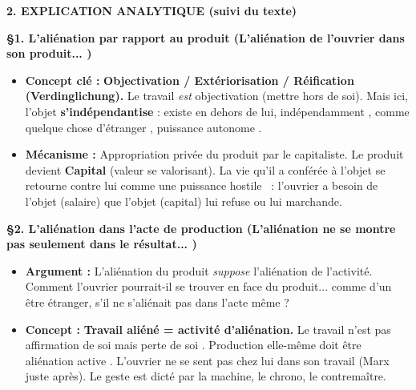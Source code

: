 \documentclass[11pt]{article}
\begin{document}
\begin{corrige}
\textbf{2. EXPLICATION ANALYTIQUE (suivi du texte)}

\textbf{§1. L'aliénation par rapport au produit (\guillemotleft L'aliénation de l'ouvrier dans son produit... \guillemotright)}
\begin{itemize}
\item \textbf{Concept clé :} \textbf{Objectivation / Extériorisation / Réification (Verdinglichung).} Le travail \emph{est} objectivation (mettre hors de soi). Mais ici, l'objet \textbf{s'indépendantise} : \guillemotleft existe en dehors de lui, indépendamment \guillemotright, \guillemotleft comme quelque chose d'étranger \guillemotright, \guillemotleft puissance autonome \guillemotright.
\item \textbf{Mécanisme :} Appropriation privée du produit par le capitaliste. Le produit devient \textbf{Capital} (valeur se valorisant). \guillemotleft La vie qu'il a conférée à l'objet se retourne contre lui comme une puissance hostile \guillemotright\ : l'ouvrier a besoin de l'objet (salaire) que l'objet (capital) lui refuse ou lui marchande.
\end{itemize}

\textbf{§2. L'aliénation dans l'acte de production (\guillemotleft L'aliénation ne se montre pas seulement dans le résultat... \guillemotright)}
\begin{itemize}
\item \textbf{Argument :} L'aliénation du produit \emph{suppose} l'aliénation de l'activité. \guillemotleft Comment l'ouvrier pourrait-il se trouver en face du produit... comme d'un être étranger, s'il ne s'aliénait pas dans l'acte même ? \guillemotright
\item \textbf{Concept :} \textbf{Travail aliéné = activité d'aliénation.} Le travail n'est pas \guillemotleft affirmation de soi \guillemotright mais \guillemotleft perte de soi \guillemotright. \guillemotleft Production elle-même doit être aliénation active \guillemotright. L'ouvrier \guillemotleft ne se sent pas chez lui \guillemotright dans son travail (Marx juste après). Le geste est dicté par la machine, le chrono, le contremaître.
\end{itemize}


\end{corrige}
\end{document}
